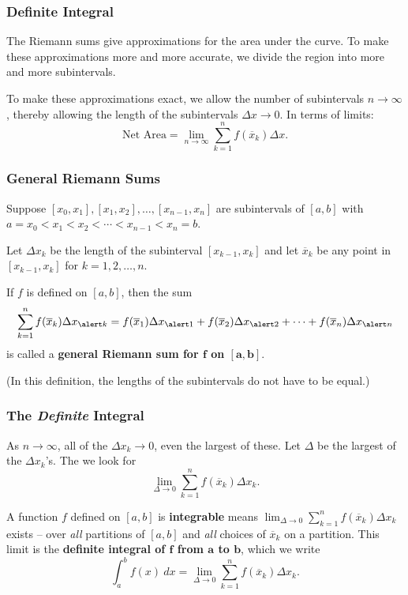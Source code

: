 \documentclass[14pt]{beamer}
\newcommand{\dsum}{\displaystyle\sum}
\begin{document}
\begin{frame}
\frametitle{\small Definite Integral}
\small
The Riemann sums give approximations for the area under the curve.  To make these approximations more and more accurate, we divide the region into more and more subintervals.

\bigskip

To make these approximations exact, we allow the number of subintervals $n \to \infty$, thereby allowing the length of the subintervals $\Delta x \to 0$.  In terms of limits:
$$\text{Net Area}=\lim_{n \to \infty} \sum_{k=1}^n f(\overline{x}_k) \Delta x.$$
\end{frame}

\begin{frame}
\frametitle{\small General Riemann Sums}
\footnotesize
Suppose $[x_0,x_1], [x_1,x_2], \dots, [x_{n-1},x_n]$ are subintervals of $[a,b]$ with $a=x_0 < x_1 < x_2 < \cdots < x_{n-1} < x_n=b$.

\bigskip

Let $\Delta x_k$ be the length of the subinterval $[x_{k-1},x_k]$ and let $\overline{x}_k$ be any point in $[x_{k-1},x_k]$ for $k=1,2,\dots,n$.

\bigskip

If $f$ is defined on $[a,b]$, then the sum
\[\sum_{k=1}^n f(\overline{x}_k) \Delta x_{\alert k} = f(\overline{x}_1)\Delta x_{\alert 1} + f(\overline{x}_2)\Delta x_{\alert 2} + \dots + f(\overline{x}_n)\Delta x_{\alert n}\]
is called a {\bf general Riemann sum for $\boldsymbol{f}$ on $\boldsymbol{[a,b]}$}.

\bigskip

(In this definition, the lengths of the subintervals do not have to be equal.)
\end{frame}

\begin{frame}
\frametitle{\small The {\it Definite} Integral}
\footnotesize
As $n \to \infty$, all of the $\Delta x_k \to 0$, even the largest of these.  Let $\Delta$ be the largest of the $\Delta x_k$'s.  The we look for 
\[\displaystyle\lim_{\Delta \to 0} \dsum_{k=1}^n f(\overline{x}_k) \Delta x_k.\] 

\vspace{-0.5pc}
\begin{dfn} A function $f$ defined on $[a,b]$ is {\bf integrable} means $\displaystyle\lim_{\Delta  \to 0} \sum_{k=1}^n f(\overline{x}_k) \Delta x_k$ exists -- over {\it all} partitions of $[a,b]$ and {\it all} choices of $\overline{x}_k$ on a partition.  This limit is the {\bf definite integral of $\boldsymbol{f}$ from $\boldsymbol{a}$ to $\boldsymbol{b}$}, which we write
\[\int_a^b f(x)\ dx = \lim_{\Delta  \to 0} \sum_{k=1}^n f(\overline{x}_k) \Delta x_k.\]
\end{dfn}
\end{frame}
\end{document}
